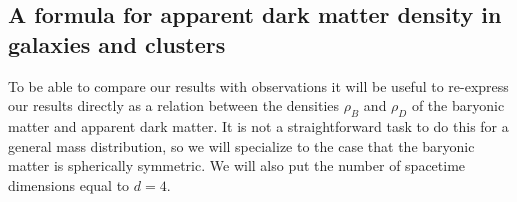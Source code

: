 \documentclass[a4paper,12pt]{article}
\begin{document}
 







\subsection{A formula for apparent dark matter density in galaxies and clusters}


To be able to compare our results with observations it will be useful to re-express our results directly as a relation between the densities $\rho_B$ and  $\rho_D$ of the baryonic matter and apparent dark matter. It is not a straightforward task to do this for a general mass distribution, so we will specialize to the case that the baryonic matter is spherically symmetric. We will also put the number of spacetime dimensions equal to $d=4$. 
\end{document}
